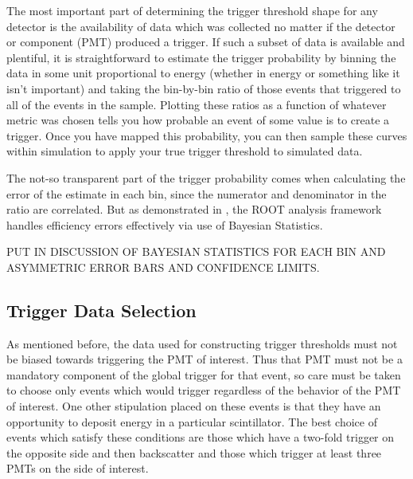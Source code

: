The most important part of determining the trigger threshold shape for 
any detector is the availability of data which was collected no matter if 
the detector or component (PMT) produced a trigger. If such a subset of 
data is available and plentiful, it is straightforward to estimate
the trigger probability by binning the data in some unit proportional to 
energy (whether in energy or something like it isn't important) and taking 
the bin-by-bin ratio of those events that triggered to all of the events in the 
sample. Plotting these ratios as a function of whatever metric was chosen tells 
you how probable an event of some value is to create a trigger.
Once you have mapped this probability, you can then sample these curves within 
simulation to apply your true trigger threshold to simulated data.

The not-so transparent part of the trigger probability comes when calculating the error of the estimate in each bin, since the numerator and denominator in the ratio are correlated. But as demonstrated in \cite{casadei2009efficiency}, the ROOT analysis framework handles efficiency errors effectively via use of Bayesian Statistics. 

PUT IN DISCUSSION OF BAYESIAN STATISTICS FOR EACH BIN AND ASYMMETRIC ERROR BARS
AND CONFIDENCE LIMITS.

\subsection{Trigger Data Selection}
As mentioned before, the data used for constructing trigger thresholds must not be 
biased towards triggering the PMT of interest. Thus that PMT must not be a mandatory 
component of the global trigger for that event, so care must be taken to choose only 
events which would trigger regardless of the behavior of the PMT of interest. One
other stipulation placed on these events is that they have an opportunity to 
deposit energy in a particular scintillator. The best choice of events which 
satisfy these conditions are those which have a two-fold trigger on the opposite side 
and then backscatter and those which trigger at least three PMTs on the side of 
interest. 

